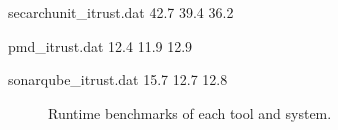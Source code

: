 \begin{filecontents*}{secarchunit_itrust.dat}
42.7
39.4
36.2
\end{filecontents*}

\begin{filecontents*}{pmd_itrust.dat}
12.4
11.9
12.9
\end{filecontents*}

\begin{filecontents*}{sonarqube_itrust.dat}
15.7
12.7
12.8
\end{filecontents*}

\begin{figure}
\centering
\captionsetup{justification=centering}


\caption{Runtime benchmarks of each tool and system.}
\label{bar:frequency_violation_comparison}
\end{figure}